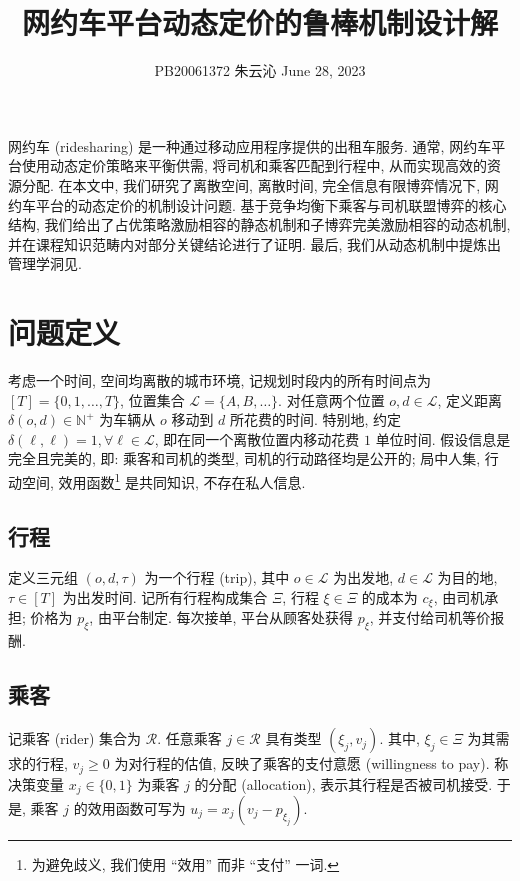 \documentclass[10pt,twocolumn]{article}
\title{网约车平台动态定价的鲁棒机制设计解}
\author{PB20061372 \quad\quad 朱云沁 \quad\quad June 28, 2023}
\date{}
\makeatletter
\def\maketitle{
  \twocolumn[
    \begin{@twocolumnfalse}
      \maketitleheader
      \vspace{0.5cm} 
      \hrule
      \vspace{0.5cm} 
    \end{@twocolumnfalse}
  ]
}
\def\maketitleheader{
  \centering
  {\LARGE\bfseries\@title\par}
  \vspace{0.5cm} 
  {\large\@author\par}
}
\makeatother
\begin{document}
\maketitle

网约车 (ridesharing) 是一种通过移动应用程序提供的出租车服务. 通常, 网约车平台使用动态定价策略来平衡供需, 将司机和乘客匹配到行程中, 从而实现高效的资源分配. 在本文中, 我们研究了离散空间, 离散时间, 完全信息有限博弈情况下, 网约车平台的动态定价的机制设计问题. 基于竞争均衡下乘客与司机联盟博弈的核心结构, 我们给出了占优策略激励相容的静态机制和子博弈完美激励相容的动态机制, 并在课程知识范畴内对部分关键结论进行了证明. 最后, 我们从动态机制中提炼出管理学洞见.

\section{问题定义}

考虑一个时间, 空间均离散的城市环境, 记规划时段内的所有时间点为 $[T] = \{0, 1, \dots, T\}$, 位置集合 $\mathcal{L} = \{A, B, \dots\}$. 对任意两个位置 $o,d\in \mathcal{L}$, 定义距离 $\delta(o,d)\in \mathbb{N}^+$ 为车辆从 $o$ 移动到 $d$ 所花费的时间. 特别地, 约定 $\delta(\ell, \ell) = 1, \forall \ell \in \mathcal{L}$, 即在同一个离散位置内移动花费 $1$ 单位时间. 假设信息是完全且完美的, 即: 乘客和司机的类型, 司机的行动路径均是公开的; 局中人集, 行动空间, 效用函数\footnote{为避免歧义, 我们使用 “效用” 而非 “支付” 一词.} 是共同知识, 不存在私人信息.

\subsection{行程}

定义三元组 $(o, d, \tau)$ 为一个行程 (trip), 其中 $o\in \mathcal{L}$ 为出发地, $d\in \mathcal{L}$ 为目的地, $\tau\in [T]$ 为出发时间. 记所有行程构成集合 $\Xi$, 行程 $\xi\in\Xi$ 的成本为 $c_\xi$, 由司机承担; 价格为 $p_\xi$, 由平台制定. 每次接单, 平台从顾客处获得 $p_\xi$, 并支付给司机等价报酬.

\subsection{乘客}

记乘客 (rider) 集合为 $\mathcal{R}$. 任意乘客 $j\in\mathcal{R}$ 具有类型 $(\xi_j, v_j)$. 其中, $\xi_j\in \Xi$ 为其需求的行程, $v_j\ge 0$ 为对行程的估值, 反映了乘客的支付意愿 (willingness to pay). 称决策变量 $x_j\in \{0, 1\}$ 为乘客 $j$ 的分配 (allocation), 表示其行程是否被司机接受. 于是, 乘客 $j$ 的效用函数可写为 $u_j = x_j (v_j - p_{\xi_j})$.
\end{document}
